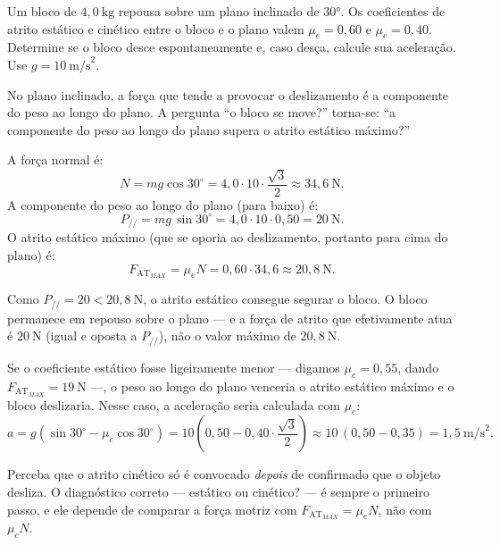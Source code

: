 \vspace{0.3cm}

\begin{exemplo}[Nível II]\label{exemplo_newton_fatcinetico02}

Um bloco de $4{,}0\ \text{kg}$ repousa sobre um plano inclinado de
$30°$. Os coeficientes de atrito estático e cinético entre o bloco
e o plano valem $\mu_e = 0{,}60$ e $\mu_c = 0{,}40$. Determine se
o bloco desce espontaneamente e, caso desça, calcule sua aceleração.
Use $g = 10\ \text{m/s}^2$.


\resolucao


No plano inclinado, a força que tende a provocar o deslizamento é a componente do peso ao longo do plano. A pergunta ``o bloco se move?'' torna-se: ``a componente do
peso ao longo do plano supera o atrito estático máximo?''

A força normal é:
\[
  N = mg\cos 30^\circ = 4{,}0 \cdot 10 \cdot \frac{\sqrt{3}}{2}
  \approx 34{,}6\ \text{N}.
\]
A componente do peso ao longo do plano (para baixo) é:
\[
  P_{//} = mg\,\sin  30^\circ = 4{,}0 \cdot 10 \cdot 0{,}50
  = 20\ \text{N}.
\]
O atrito estático máximo (que se oporia ao deslizamento, portanto
para cima do plano) é:
\[
  F_{\text{AT}_{MAX}} = \mu_e N = 0{,}60 \cdot 34{,}6
  \approx 20{,}8\ \text{N}.
\]

Como $P_{//} = 20 <20{,}8\
\text{N}$, o atrito estático consegue segurar o bloco.
O bloco permanece em repouso sobre o plano — e a força de atrito
que efetivamente atua é $20\ \text{N}$ (igual e oposta a
$P_{//}$), não o valor máximo de $20{,}8\ \text{N}$.

Se o coeficiente estático fosse ligeiramente menor — digamos
$\mu_e = 0{,}55$, dando $F_{\text{AT}_{MAX}} = 19\ \text{N}$ —,
o peso ao longo do plano venceria o atrito estático máximo e o bloco deslizaria.
Nesse caso, a aceleração seria calculada com $\mu_c$:
\[
  a = g\left(\sin 30^\circ - \mu_c\cos 30^\circ \right)
  = 10\!\left(0{,}50 - 0{,}40\cdot\frac{\sqrt{3}}{2}\right)
  \approx 10\,(0{,}50 - 0{,}35)
  = 1{,}5\ \text{m/s}^2.
\]

Perceba que o atrito cinético só é convocado \emph{depois} de
confirmado que o objeto desliza. O diagnóstico correto — estático ou cinético? — é sempre o primeiro passo, e ele depende de comparar a força motriz com
$F_{\text{AT}_{MAX}} = \mu_e N$, não com $\mu_c N$.


\end{exemplo}


\vspace{0.3cm}



